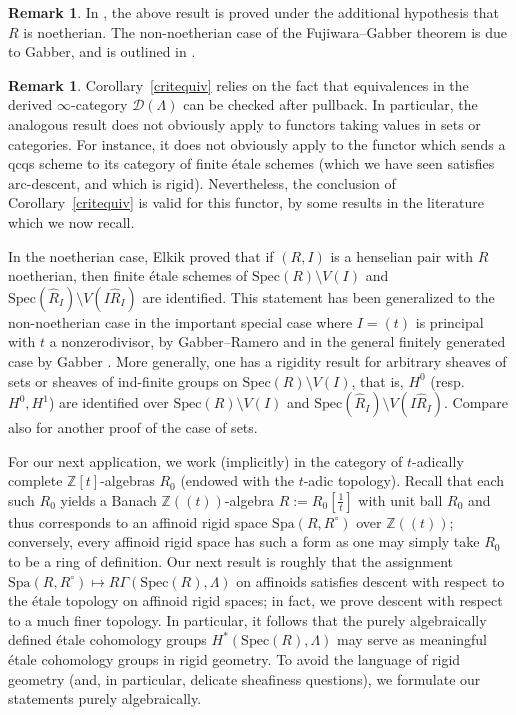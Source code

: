 \documentclass[reqno]{amsart}
\newcommand{\spec}{\mathrm{Spec}}
\newcommand{\arc}{\mathrm{arc}}
\newcommand{\D}{\mathcal{D}}
\theoremstyle{definition}
\newtheorem{remark}[theorem]{Remark}
\begin{document}
\begin{remark} 
In \cite{Fujiwara}, the above result is proved under the additional
hypothesis that $R$ is noetherian. The non-noetherian case of the Fujiwara--Gabber theorem 
is due to Gabber, and is outlined in 
\cite[Exp.~XX, Sec.~4.4]{Travaux}. 
\end{remark} 
\begin{remark} 
Corollary~\ref{critequiv} relies on the fact that equivalences in the derived
$\infty$-category $\D( \Lambda)$ can be checked after pullback. In particular, the
analogous result does not obviously apply to functors taking values in sets or
categories. For instance, it does not obviously apply to the functor which
sends a qcqs scheme to its category of finite \'etale schemes (which we have
seen satisfies $\arc$-descent, and which is rigid). Nevertheless, the conclusion
of Corollary~\ref{critequiv} is valid for this functor, by some results in the
literature which we now recall. 

In the noetherian case,  Elkik \cite{Elkik} proved that if $(R, I)$ is a henselian pair with $R$ noetherian,
then finite \'etale schemes of $\spec(R) \setminus V(I)$ and $\spec( \hat{R}_I)
\setminus V(I \hat{R}_I)$ are identified. This statement has been generalized
to the non-noetherian case in the important special case where $I =
(t)$ is principal with $t$ a nonzerodivisor, by Gabber--Ramero \cite[Prop.~5.4.53]{GabberRamero} and 
in the general finitely generated case by Gabber \cite[Exp.~XX, Th\'eor\`eme
2.1.2]{Travaux}. 
More generally, one has a rigidity result for arbitrary
sheaves of sets or sheaves of ind-finite groups on $\spec(R) \setminus V(I)$, that is,
$H^0$ (resp.~$H^0, H^1$) are identified over $\spec(R) \setminus V(I)$ and
$\spec( \hat{R}_I) \setminus V(I \hat{R}_I)$. 
Compare also \cite[Theorem 6.4]{HallRydh} for another proof of the case of sets. 
 \end{remark} 


For our next application, we work (implicitly) in the category of $t$-adically complete $\mathbb{Z}[t]$-algebras $R_0$ (endowed with the $t$-adic topology). Recall that each such $R_0$ yields a Banach $\mathbb{Z}((t))$-algebra $R := R_0[\frac{1}{t}]$ with unit ball $R_0$ and thus corresponds to an affinoid rigid space $\mathrm{Spa}(R, R^\circ)$ over $\mathbb{Z}((t))$; conversely, every affinoid rigid space has such a form as one may simply take $R_0$ to be a ring of definition. Our next result is roughly that the assignment $\mathrm{Spa}(R,R^\circ) \mapsto R\Gamma(\spec(R), \Lambda)$ on affinoids satisfies descent with respect to the \'etale topology on affinoid rigid spaces; in fact, we prove descent with respect to a much finer topology. In particular, it follows that the purely algebraically defined \'etale cohomology groups $H^*(\spec(R), \Lambda)$ may serve as meaningful \'etale cohomology groups in rigid geometry. To avoid the language of rigid geometry (and, in particular, delicate sheafiness questions), we formulate our statements purely algebraically. 
\end{document}
